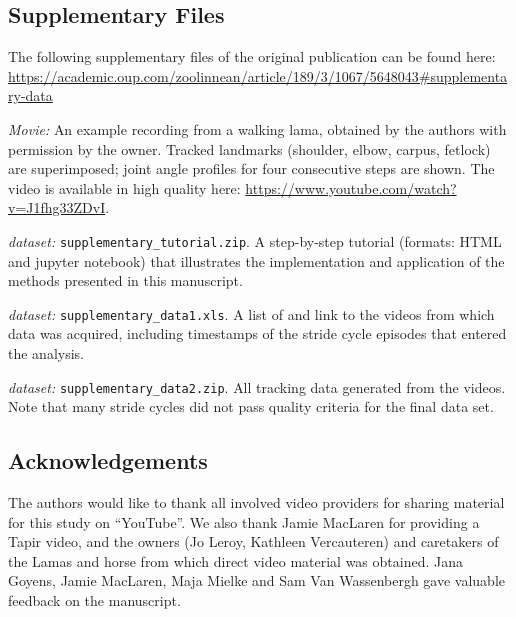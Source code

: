 \FloatBarrier\clearpage

\subsection{Supplementary Files}\label{fcas_supplementary_files}
The following supplementary files of the original publication can be found here:
\\\url{https://academic.oup.com/zoolinnean/article/189/3/1067/5648043#supplementary-data}


\textit{Movie:} {An example recording from a walking lama, obtained by the authors with permission by the owner. Tracked landmarks (shoulder, elbow, carpus, fetlock) are superimposed; joint angle profiles for four consecutive steps are shown. The video is available in high quality here: \url{https://www.youtube.com/watch?v=J1fhg33ZDvI}. }\label{supp:movie1}


\textit{dataset:} \texttt{supplementary\_tutorial.zip}. {A step-by-step tutorial (formats: HTML and jupyter notebook) that illustrates the implementation and application of the methods presented in this manuscript.}\label{supp:tutorial}


\textit{dataset:} \texttt{supplementary\_data1.xls}. {A list of and link to the videos from which data was acquired, including timestamps of the stride cycle episodes that entered the analysis. }\label{supp:data1}


\textit{dataset:} \texttt{supplementary\_data2.zip}. {All tracking data generated from the videos. Note that many stride cycles did not pass quality criteria for the final data set. }\label{supp:data2}






\vspace{3cm}
\subsection{Acknowledgements}
The authors would like to thank all involved video providers for sharing material for this study on ``YouTube''.
We also thank Jamie MacLaren for providing a Tapir video, and the owners (Jo Leroy, Kathleen Vercauteren) and caretakers of the Lamas and horse from which direct video material was obtained. 
Jana Goyens, Jamie MacLaren, Maja Mielke and Sam Van Wassenbergh gave valuable feedback on the manuscript.



% 
% 

